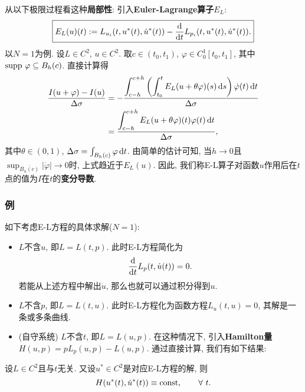 从以下极限过程看这种\textbf{局部性}: 引入\textbf{Euler-Lagrange算子}$E_L$:
\begin{equation*}
    \boxed{E_L(u)(t) := L_{u_i}(t, u^*(t), \dot{u}^*(t)) - \frac{{\rm d}}{{\rm d}t}L_{p_i}(t, u^*(t), \dot{u}^*(t)).}
\end{equation*}
以$N = 1$为例. 设$L \in C^2$, $u \in C^2$. 取$c \in (t_0, t_1)$, $\varphi \in C_0^1[t_0, t_1]$, 其中${\rm supp}\ \varphi \subseteq B_h(c)$.
直接计算得 
\begin{align*}
    \frac{I(u + \varphi) - I(u)}{\Delta\sigma} &=- \frac{\displaystyle\int_{c - h}^{c + h}\left(\int_{t_0}^tE_L(u + \theta\varphi)(s) \,{\rm d}s\right)\dot{\varphi}(t) \,{\rm d}t}{\Delta\sigma} \\ 
    &= \frac{\displaystyle\int_{c - h}^{c + h}E_L(u + \theta\varphi)(t)\varphi(t) \,{\rm d}t}{\Delta\sigma},
\end{align*}
其中$\theta \in (0, 1)$, $\Delta\sigma = \int_{B_h(c)}\varphi \,{\rm d}t$.
由简单的估计可知, 当$h \rightarrow 0$且$\sup_{\overline{B_h(c)}}|\dot\varphi| \rightarrow 0$时, 上式趋近于$E_L(u)$.
因此, 我们称E-L算子对函数$u$作用后在$t$点的值为$I$在$t$的\textbf{变分导数}.

\subsubsection{例}

如下考虑E-L方程的具体求解($N = 1$):

\begin{itemize}
    \item $L$不含$u$, 即$L = L(t, p)$. 此时E-L方程简化为 
    \begin{equation*}
        \frac{{\rm d}}{{\rm d}t}L_p(t, \dot{u}(t)) = 0.
    \end{equation*}
    若能从上述方程中解出$\dot u$, 那么也就可以通过积分得到$u$.
    \item $L$不含$p$, 即$L = L(t, u)$. 此时E-L方程化为函数方程$L_u(t, u) = 0$, 其解是一条或多条曲线.
    \item (自守系统) $L$不含$t$, 即$L = L(u, p)$. 在这种情况下, 引入\textbf{Hamilton量}$H(u, p) = pL_p(u, p) - L(u, p)$.
    通过直接计算, 我们有如下结果:
\end{itemize}

\begin{proposition}
    设$L \in C^2$且与$t$无关. 又设$u^* \in C^2$是对应E-L方程的解, 则
    \begin{equation*}
        H(u^*(t), \dot u^*(t)) \equiv {\rm const}, \qquad \forall\ t.
    \end{equation*}
\end{proposition}

